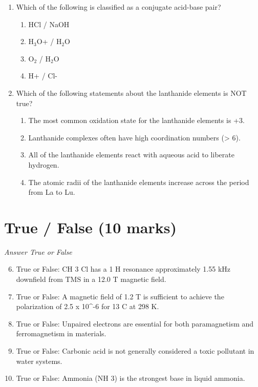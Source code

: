 \documentclass[12pt]{article}
\begin{document}
\begin{enumerate}[label=\arabic*.]
\begin{enumerate}[label=(\alph*)]
\end{enumerate}
\item Which of the following is classified as a conjugate acid-base pair?
\begin{enumerate}[label=(\alph*)]
    \item HCl / NaOH
    \item H$_{3}$O+ / H$_{2}$O
    \item O$_{2}$ / H$_{2}$O
    \item H+ / Cl-
\end{enumerate}
\item Which of the following statements about the lanthanide elements is NOT true?
\begin{enumerate}[label=(\alph*)]
    \item The most common oxidation state for the lanthanide elements is +3.
    \item Lanthanide complexes often have high coordination numbers (\textgreater{} 6).
    \item All of the lanthanide elements react with aqueous acid to liberate hydrogen.
    \item The atomic radii of the lanthanide elements increase across the period from La to Lu.
\end{enumerate}
\end{enumerate}

\section*{True / False (10 marks)}
\textit{Answer True or False}
\begin{enumerate}[label=\arabic*.]
\setcounter{enumi}{5}
\item True or False: CH 3 Cl has a 1 H resonance approximately 1.55 kHz downfield from TMS in a 12.0 T magnetic field.
\item True or False: A magnetic field of 1.2 T is sufficient to achieve the polarization of 2.5 x 10^-6 for 13 C at 298 K.
\item True or False: Unpaired electrons are essential for both paramagnetism and ferromagnetism in materials.
\item True or False: Carbonic acid is not generally considered a toxic pollutant in water systems.
\item True or False: Ammonia (NH 3) is the strongest base in liquid ammonia.
\end{enumerate}
\end{document}
